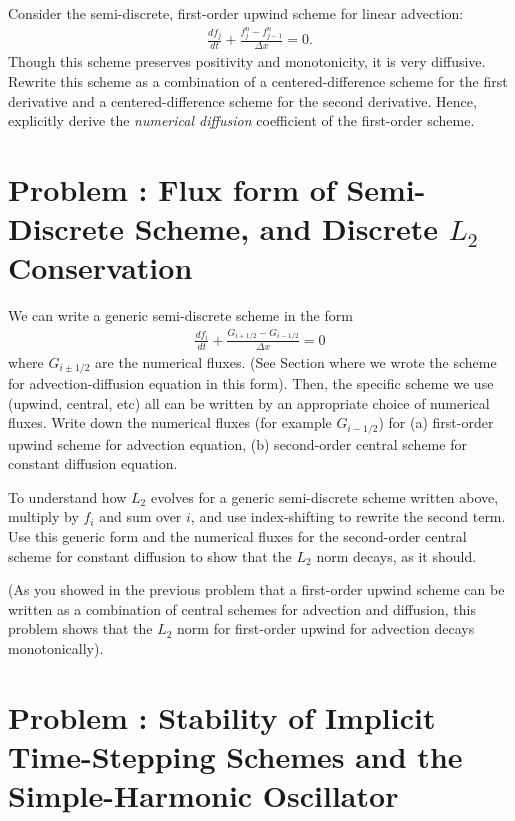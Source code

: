 \documentclass[12pt]{article}
\theoremstyle{definition}
\theoremstyle{definition}
\theoremstyle{definition}
\newcounter{probnum}
\begin{document}
Consider the semi-discrete, first-order upwind scheme for linear
advection:
\begin{align*}
  \frac{df_j}{dt} + \frac{f_j^n - f_{j-1}^n}{\Delta x} = 0.
\end{align*}
Though this scheme preserves positivity and monotonicity, it is very
diffusive. Rewrite this scheme as a combination of a
centered-difference scheme for the first derivative and a
centered-difference scheme for the second derivative. Hence,
explicitly derive the \emph{numerical diffusion} coefficient of the
first-order scheme.

\section*{Problem : Flux form of Semi-Discrete Scheme,
  and Discrete $L_2$ Conservation}

We can write a generic semi-discrete scheme in the form
\begin{align}
  \frac{df_i}{dt} + \frac{G_{i+1/2}- G_{i-1/2} }{\Delta x} = 0
\end{align}
where $G_{i\pm 1/2}$ are the numerical fluxes. (See Section where we wrote the scheme for advection-diffusion equation in this
form). Then, the specific scheme we use (upwind, central, etc) all can
be written by an appropriate choice of numerical fluxes. Write down
the numerical fluxes (for example $G_{i-1/2}$) for (a) first-order
upwind scheme for advection equation, (b) second-order central scheme
for constant diffusion equation.

To understand how $L_2$ evolves for a generic semi-discrete scheme
written above, multiply by $f_i$ and sum over $i$, and use
index-shifting to rewrite the second term. Use this generic form and
the numerical fluxes for the second-order central scheme for constant
diffusion to show that the $L_2$ norm decays, as it should.

(As you showed in the previous problem that a first-order upwind
scheme can be written as a combination of central schemes for
advection and diffusion, this problem shows that the $L_2$ norm for
first-order upwind for advection decays monotonically).

\section*{Problem : Stability of Implicit
  Time-Stepping Schemes and the Simple-Harmonic Oscillator}
\end{document}
